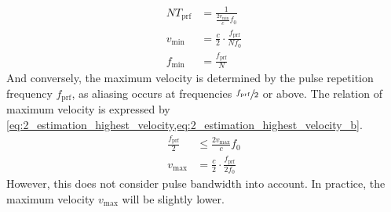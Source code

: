 \begin{subequations}
	\begin{align}
		N T_{\mathrm{prf}} &= \frac{1}{\frac{2v_{\mathrm{min}}}{c}f_{0}} \label{eq:2_estimation_lowest_velocity} \\
		v_{\mathrm{min}} &= \frac{c}{2}\cdot\frac{f_{\mathrm{prf}}}{N f_{0}} \label{eq:2_estimation_lowest_velocity_b} \\
		f_{\mathrm{min}} &= \frac{f_{\mathrm{prf}}}{N} \label{eq:2_estimation_lowest_frequency}
	\end{align}
\end{subequations}
And conversely, the maximum velocity is determined by the pulse repetition frequency $f_{\mathrm{prf}}$, as aliasing occurs at frequencies $\sfrac{f_{\mathrm{prf}}}{2}$ or above. The relation of maximum velocity is expressed by \cref{eq:2_estimation_highest_velocity,eq:2_estimation_highest_velocity_b}.
\begin{subequations}
	\begin{align}
		\frac{f_{\mathrm{prf}}}{2} &\le \frac{2v_{\mathrm{max}}}{c}f_{0} \label{eq:2_estimation_highest_velocity} \\
		v_{\mathrm{max}} &= \frac{c}{2}\cdot \frac{f_{\mathrm{prf}}}{2f_{0}} \label{eq:2_estimation_highest_velocity_b}
	\end{align}
\end{subequations}
However, this does not consider pulse bandwidth into account. In practice, the maximum velocity $v_{\mathrm{max}}$ will be slightly lower.
